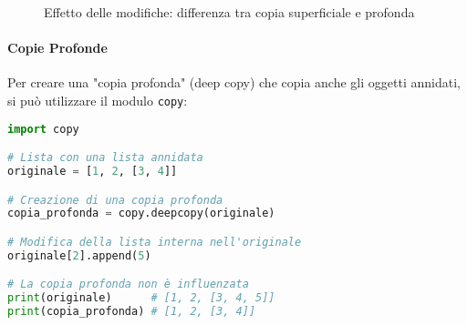 \begin{figure}[htbp]
    \caption{Effetto delle modifiche: differenza tra copia superficiale e profonda}
    \label{fig:deep-copy-after}
\end{figure}

\newpage
\paragraph{Copie Profonde}

Per creare una "copia profonda" (deep copy) che copia anche gli oggetti annidati, si può utilizzare il modulo \texttt{copy}:

\begin{lstlisting}[language=Python]
import copy

# Lista con una lista annidata
originale = [1, 2, [3, 4]]

# Creazione di una copia profonda
copia_profonda = copy.deepcopy(originale)

# Modifica della lista interna nell'originale
originale[2].append(5)

# La copia profonda non è influenzata
print(originale)      # [1, 2, [3, 4, 5]]
print(copia_profonda) # [1, 2, [3, 4]]
\end{lstlisting}

